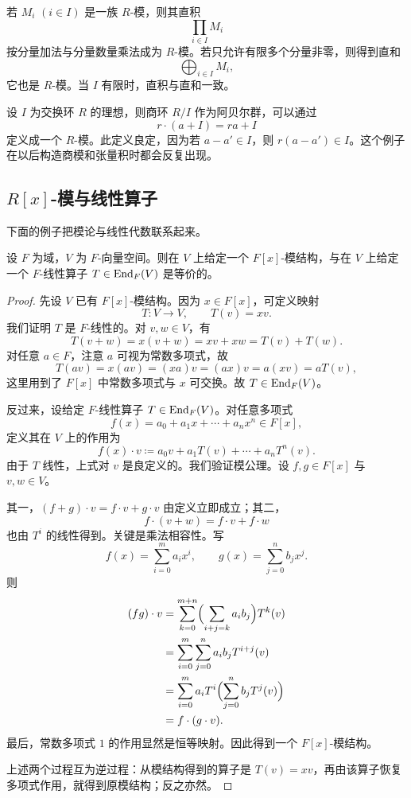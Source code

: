 \begin{example}[直积与直和]
若 $M_i$ $(i\in I)$ 是一族 $R$-模，则其直积
\[
\prod_{i\in I} M_i
\]
按分量加法与分量数量乘法成为 $R$-模。若只允许有限多个分量非零，则得到直和
\[
\bigoplus_{i\in I} M_i,
\]
它也是 $R$-模。当 $I$ 有限时，直积与直和一致。
\end{example}

\begin{example}[商环诱导的模]
设 $I$ 为交换环 $R$ 的理想，则商环 $R/I$ 作为阿贝尔群，可以通过
\[
r\cdot (a+I)=ra+I
\]
定义成一个 $R$-模。此定义良定，因为若 $a-a'\in I$，则 $r(a-a')\in I$。这个例子在以后构造商模和张量积时都会反复出现。
\end{example}

\subsection{$R[x]$-模与线性算子}

下面的例子把模论与线性代数联系起来。

\begin{proposition}
设 $F$ 为域，$V$ 为 $F$-向量空间。则在 $V$ 上给定一个 $F[x]$-模结构，与在 $V$ 上给定一个 $F$-线性算子 $T\in\mathrm{End}_F(V)$ 是等价的。
\end{proposition}

\begin{proof}
先设 $V$ 已有 $F[x]$-模结构。因为 $x\in F[x]$，可定义映射
\[
T\colon V\to V,\qquad T(v)=xv.
\]
我们证明 $T$ 是 $F$-线性的。对 $v,w\in V$，有
\[
T(v+w)=x(v+w)=xv+xw=T(v)+T(w).
\]
对任意 $a\in F$，注意 $a$ 可视为常数多项式，故
\[
T(av)=x(av)=(xa)v=(ax)v=a(xv)=aT(v),
\]
这里用到了 $F[x]$ 中常数多项式与 $x$ 可交换。故 $T\in \mathrm{End}_F(V)$。

反过来，设给定 $F$-线性算子 $T\in\mathrm{End}_F(V)$。对任意多项式
\[
f(x)=a_0+a_1x+\cdots+a_nx^n\in F[x],
\]
定义其在 $V$ 上的作用为
\[
f(x)\cdot v\coloneqq a_0v+a_1T(v)+\cdots+a_nT^n(v).
\]
由于 $T$ 线性，上式对 $v$ 是良定义的。我们验证模公理。设 $f,g\in F[x]$ 与 $v,w\in V$。

其一，$(f+g)\cdot v=f\cdot v+g\cdot v$ 由定义立即成立；其二，
\[
f\cdot (v+w)=f\cdot v+f\cdot w
\]
也由 $T^i$ 的线性得到。关键是乘法相容性。写
\[
f(x)=\sum_{i=0}^m a_ix^i,\qquad g(x)=\sum_{j=0}^n b_jx^j.
\]
则
\begin{align*}
(fg)\cdot v
&=\sum_{k=0}^{m+n}\Bigl(\sum_{i+j=k}a_ib_j\Bigr)T^k(v)\\
&=\sum_{i=0}^m\sum_{j=0}^n a_ib_jT^{i+j}(v)\\
&=\sum_{i=0}^m a_iT^i\Bigl(\sum_{j=0}^n b_jT^j(v)\Bigr)\\
&=f\cdot (g\cdot v).
\end{align*}
最后，常数多项式 $1$ 的作用显然是恒等映射。因此得到一个 $F[x]$-模结构。

上述两个过程互为逆过程：从模结构得到的算子是 $T(v)=xv$，再由该算子恢复多项式作用，就得到原模结构；反之亦然。
\end{proof}

